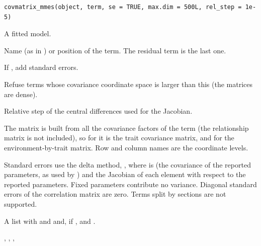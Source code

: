 \documentclass[a4paper]{book}
\begin{document}
%
\begin{Usage}
\begin{verbatim}
covmatrix_mmes(object, term, se = TRUE, max.dim = 500L, rel_step = 1e-5)
\end{verbatim}
\end{Usage}
%
\begin{Arguments}
\begin{ldescription}
\item[\code{object}] A fitted  model.
\item[\code{term}] Name (as in ) or position of the
term. The residual term is the last one.
\item[\code{se}] If , add standard errors.
\item[\code{max.dim}] Refuse terms whose covariance coordinate space is larger than
this (the matrices are dense).
\item[\code{rel\_step}] Relative step of the central differences used for the
Jacobian.
\end{ldescription}
\end{Arguments}
%
\begin{Details}\relax
The matrix is  built from all the
covariance factors of the  term (the relationship matrix
 is not included), so for  it is the
trait covariance matrix, and for  the
environment-by-trait matrix. Row and column names are the coordinate levels.

Standard errors use the delta method,
, where  is
 (the covariance of the reported parameters, as used by
) and  the Jacobian of each element with
respect to the reported parameters. Fixed parameters contribute no variance.
Diagonal standard errors of the correlation matrix are zero. Terms split by
 sections are not supported.
\end{Details}
%
\begin{Value}
A list with  and  and, if
,  and .
\end{Value}
%
\begin{SeeAlso}\relax
{}, ,
, 
\end{SeeAlso}
\end{document}
